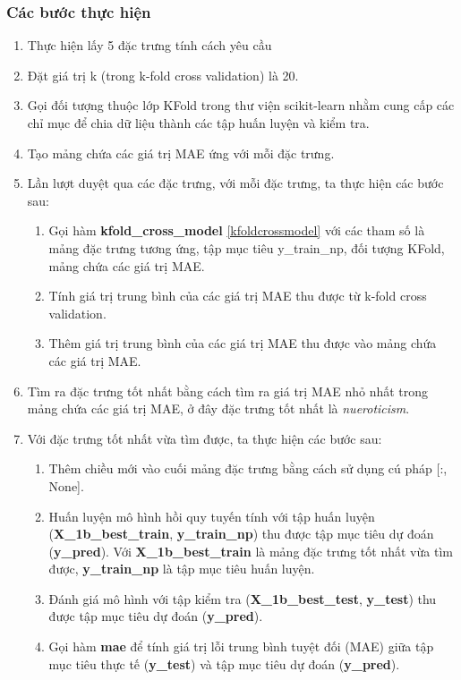 \documentclass[]{article}
\begin{document}
\subsubsection{Các bước thực hiện}
\begin{enumerate}
  \item Thực hiện lấy 5 đặc trưng tính cách yêu cầu
  \item Đặt giá trị k (trong k-fold cross validation) là 20.
  \item Gọi đối tượng thuộc lớp KFold trong thư viện scikit-learn nhằm cung cấp các chỉ mục để chia dữ liệu thành các tập huấn luyện và kiểm tra. 
  \item Tạo mảng chứa các giá trị MAE ứng với mỗi đặc trưng.
  \item Lần lượt duyệt qua các đặc trưng, với mỗi đặc trưng, ta thực hiện các bước sau:
  \begin{enumerate}
    \item Gọi hàm \textbf{kfold\_cross\_model} \ref{kfoldcrossmodel} với các tham số là mảng đặc trưng tương ứng, tập mục tiêu y\_train\_np, đối tượng KFold, mảng chứa các giá trị MAE.
    \item Tính giá trị trung bình của các giá trị MAE thu được từ k-fold cross validation.
    \item Thêm giá trị trung bình của các giá trị MAE thu được vào mảng chứa các giá trị MAE.
  \end{enumerate}
  \item Tìm ra đặc trưng tốt nhất bằng cách tìm ra giá trị MAE nhỏ nhất trong mảng chứa các giá trị MAE, ở đây đặc trưng tốt nhất là \textit{nueroticism}.
  \item Với đặc trưng tốt nhất vừa tìm được, ta thực hiện các bước sau:
  \begin{enumerate}
    \item Thêm chiều mới vào cuối mảng đặc trưng bằng cách sử dụng cú pháp [:, None].
    \item Huấn luyện mô hình hồi quy tuyến tính với tập huấn luyện (\textbf{X\_1b\_best\_train}, \textbf{y\_train\_np}) thu được tập mục tiêu dự đoán (\textbf{y\_pred}). Với \textbf{X\_1b\_best\_train} là mảng đặc trưng tốt nhất vừa tìm được, \textbf{y\_train\_np} là tập mục tiêu huấn luyện. 
    \item Đánh giá mô hình với tập kiểm tra (\textbf{X\_1b\_best\_test}, \textbf{y\_test}) thu được tập mục tiêu dự đoán (\textbf{y\_pred}).
    \item Gọi hàm \textbf{mae} để tính giá trị lỗi trung bình tuyệt đối (MAE) giữa tập mục tiêu thực tế (\textbf{y\_test}) và tập mục tiêu dự đoán (\textbf{y\_pred}).
  \end{enumerate}
\end{enumerate}
\end{document}
